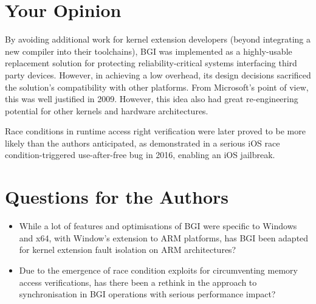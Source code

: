 \documentclass[11pt]{article}
\begin{document}
\section*{Your Opinion}

By avoiding additional work for kernel extension developers (beyond integrating a new compiler into their toolchains), BGI was implemented as a highly-usable replacement solution for protecting reliability-critical systems interfacing third party devices. However, in achieving a low overhead, its design decisions sacrificed the solution's compatibility with other platforms. From Microsoft's point of view, this was well justified in 2009. However, this idea also had great  re-engineering  potential for other kernels and hardware architectures. 

Race conditions in runtime access right verification were later proved to be more likely than the authors anticipated, as demonstrated in a serious iOS race condition-triggered use-after-free bug \cite{ianbeer} in 2016, enabling an iOS jailbreak.

\section*{Questions for the Authors}

\begin{itemize}
	\item While a lot of features and optimisations of BGI were specific to Windows and x64, with Window's extension to ARM platforms, has BGI been adapted for kernel extension fault isolation on ARM architectures?
	\item Due to the emergence of race condition exploits for circumventing memory access verifications, has there been a rethink in the approach to synchronisation in BGI operations with serious performance impact?
\end{itemize}


\footnotesize{}
\end{document}

